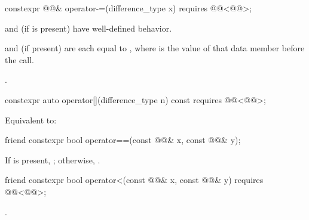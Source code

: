 %
\begin{itemdecl}
constexpr @@& operator-=(difference_type x)
  requires @@<@@>;
\end{itemdecl}

\begin{itemdescr}
\pnum
\expects
{} and  (if  is present)
have well-defined behavior.

\pnum
\ensures
{} and  (if present) are
each equal to ,
where  is the value of that data member before the call.

\pnum
\returns
{}.
\end{itemdescr}

%
\begin{itemdecl}
constexpr auto operator[](difference_type n) const
  requires @@<@@>;
\end{itemdecl}

\begin{itemdescr}
\pnum
\effects
Equivalent to: 
\end{itemdescr}

%
\begin{itemdecl}
friend constexpr bool operator==(const @@& x, const @@& y);
\end{itemdecl}

\begin{itemdescr}
\pnum
\returns
If  is present,
;
otherwise, .
\end{itemdescr}

%
\begin{itemdecl}
friend constexpr bool operator<(const @@& x, const @@& y)
  requires @@<@@>;
\end{itemdecl}

\begin{itemdescr}
\pnum
\returns
{}.
\end{itemdescr}

